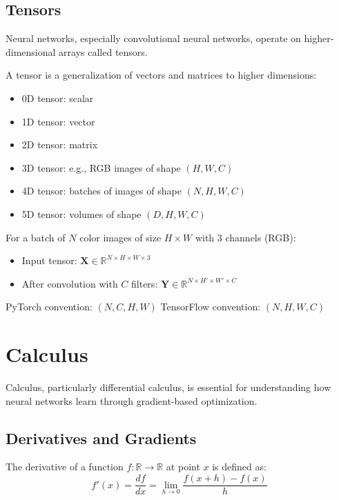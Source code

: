 \subsection{Tensors}

Neural networks, especially convolutional neural networks, operate on higher-dimensional arrays called tensors.

\begin{definition}[Tensor]
A tensor is a generalization of vectors and matrices to higher dimensions:
\begin{itemize}
    \item 0D tensor: scalar
    \item 1D tensor: vector
    \item 2D tensor: matrix
    \item 3D tensor: e.g., RGB images of shape $(H, W, C)$
    \item 4D tensor: batches of images of shape $(N, H, W, C)$
    \item 5D tensor: volumes of shape $(D, H, W, C)$
\end{itemize}
\end{definition}

\begin{example}
For a batch of $N$ color images of size $H \times W$ with 3 channels (RGB):
\begin{itemize}
    \item Input tensor: $\mathbf{X} \in \mathbb{R}^{N \times H \times W \times 3}$
    \item After convolution with $C$ filters: $\mathbf{Y} \in \mathbb{R}^{N \times H' \times W' \times C}$
\end{itemize}
PyTorch convention: $(N, C, H, W)$
TensorFlow convention: $(N, H, W, C)$
\end{example}

\section{Calculus}

Calculus, particularly differential calculus, is essential for understanding how neural networks learn through gradient-based optimization.

\subsection{Derivatives and Gradients}

\begin{definition}[Derivative]
The derivative of a function $f: \mathbb{R} \to \mathbb{R}$ at point $x$ is defined as:
\begin{equation}
f'(x) = \frac{df}{dx} = \lim_{h \to 0} \frac{f(x + h) - f(x)}{h}
\end{equation}
\end{definition}


